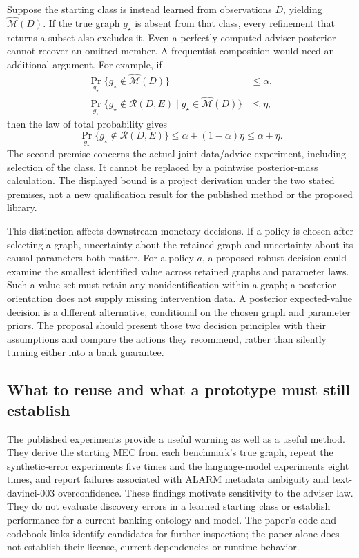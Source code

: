 Suppose the starting class is instead learned from observations $D$, yielding
$\widehat{\mathcal M}(D)$. If the true graph $g_\star$ is absent from that
class, every refinement that returns a subset also excludes it. Even a
perfectly computed adviser posterior cannot recover an omitted member. A
frequentist composition would need an additional argument. For example, if
\begin{equation}
\begin{split}
 \Pr_{g_\star}\{g_\star\notin\widehat{\mathcal M}(D)\}&\leq\alpha,\\
 \Pr_{g_\star}\{g_\star\notin\mathcal R(D,E)
       \mid g_\star\in\widehat{\mathcal M}(D)\}&\leq\eta,
\end{split}
\label{exec17:advice-coverage-premises}
\end{equation}
then the law of total probability gives
\begin{equation}
 \Pr_{g_\star}\{g_\star\notin\mathcal R(D,E)\}
       \leq\alpha+(1-\alpha)\eta\leq\alpha+\eta.
\label{exec17:advice-coverage-composition}
\end{equation}
The second premise concerns the actual joint data/advice experiment, including
selection of the class. It cannot be replaced by a pointwise posterior-mass
calculation. The displayed bound is a project derivation under the two stated
premises, not a new qualification result for the published method or the
proposed library.

This distinction affects downstream monetary decisions. If a policy is chosen
after selecting a graph, uncertainty about the retained graph and uncertainty
about its causal parameters both matter. For a policy $a$, a proposed robust
decision could examine the smallest identified value across retained graphs
and parameter laws. Such a value set must retain any nonidentification within
a graph; a posterior orientation does not supply missing intervention data.
A posterior expected-value decision is a different alternative, conditional
on the chosen graph and parameter priors. The proposal should present those
two decision principles with their assumptions and compare the actions they
recommend, rather than silently turning either into a bank guarantee.

\subsection{What to reuse and what a prototype must still establish}

The published experiments provide a useful warning as well as a useful method.
They derive the starting MEC from each benchmark's true graph, repeat the
synthetic-error experiments five times and the language-model experiments
eight times, and report failures associated with ALARM metadata ambiguity and
text-davinci-003 overconfidence. These findings motivate sensitivity to the
adviser law. They do not evaluate discovery errors in a learned starting class
or establish performance for a current banking ontology and model. The
paper's code and codebook links identify candidates for further inspection;
the paper alone does not establish their license, current dependencies or
runtime behavior.~\citep{exec17_imperfect_experts}

